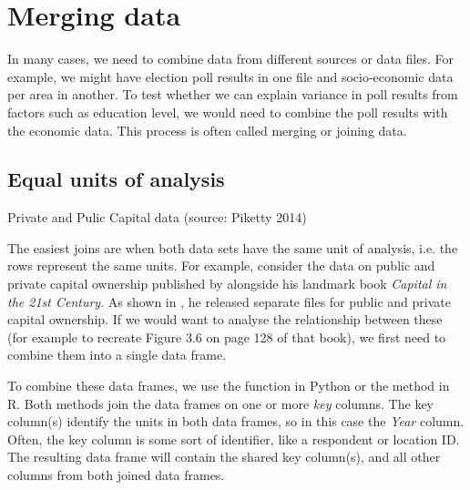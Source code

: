\section{Merging data}

In many cases, we need to combine data from different sources or data files.
For example, we might have election poll results in one file and socio-economic data per area in another.
To test whether we can explain variance in poll results from factors such as education level,
we would need to combine the poll results with the economic data.
This process is often called merging or joining data.

\subsection{Equal units of analysis}


\begin{ccsexample}
\caption{Private and Pulic Capital data (source: Piketty 2014)}\label{ex:piketty}
\end{ccsexample}


The easiest joins are when both data sets have the same unit of analysis,
i.e. the rows represent the same units.
For example, consider the data on public and private capital ownership published by
\cite{Piketty} alongside his landmark book \emph{Capital in the 21st Century}.
As shown in , he released separate files for public and private capital ownership.
If we would want to analyse the relationship between these (for example to recreate Figure 3.6 on page 128 of that book),
we first need to combine them into a single data frame.

To combine these data frames, we use the  function  in Python or the  method  in R.
Both methods join the data frames on one or more \emph{key} columns.
The key column(s) identify the units in both data frames, so in this case the \emph{Year} column.
Often, the key column is some sort of identifier, like a respondent or location ID.
The resulting data frame will contain the shared key column(s), and all other columns from both joined data frames.

